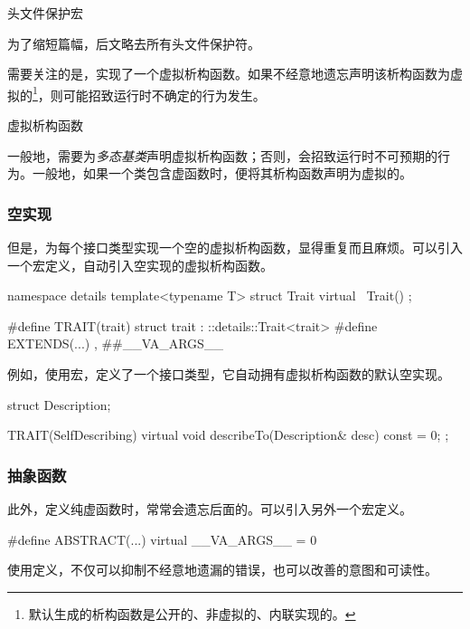 \begin{content}
\begin{episode}{头文件保护宏}
\begin{content}
为了缩短篇幅，后文略去所有头文件保护符。

\end{content}
\end{episode}

需要关注的是，实现了一个虚拟析构函数。如果不经意地遗忘声明该析构函数为虚拟的\footnote{默认生成的析构函数是公开的、非虚拟的、内联实现的。}，则可能招致运行时不确定的行为发生。

\begin{episode}{虚拟析构函数}
\begin{content}

一般地，需要为\emph{多态基类}声明虚拟析构函数；否则，会招致运行时不可预期的行为。一般地，如果一个类包含虚函数时，便将其析构函数声明为虚拟的。

\subsubsection{空实现}

但是，为每个接口类型实现一个空的虚拟析构函数，显得重复而且麻烦。可以引入一个宏定义，自动引入空实现的虚拟析构函数。

 \begin{c++}
namespace details {
  template<typename T>
  struct Trait {
    virtual ~Trait() {}
  };
}

#define TRAIT(trait)  struct trait : ::details::Trait<trait>
#define EXTENDS(...) , ##__VA_ARGS__
 \end{c++}

例如，使用宏，定义了一个接口类型，它自动拥有虚拟析构函数的默认空实现。

 \begin{c++}
struct Description;

TRAIT(SelfDescribing) {
  virtual void describeTo(Description& desc) const = 0;
};
 \end{c++}

\subsubsection{抽象函数}

此外，定义纯虚函数时，常常会遗忘后面的。可以引入另外一个宏定义。

 \begin{c++}
#define ABSTRACT(...) virtual __VA_ARGS__ = 0
 \end{c++}

使用定义，不仅可以抑制不经意地遗漏的错误，也可以改善的意图和可读性。


\end{content}
\end{episode}
\end{content}
